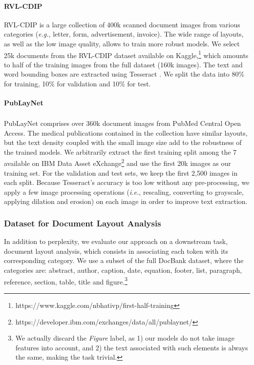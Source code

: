\paragraph{RVL-CDIP}

RVL-CDIP is a large collection of 400k scanned document images from various categories (\textit{e.g.}, letter, form, advertisement, invoice). The wide range of layouts, as well as the low image quality, allows to train more robust models. We select 25k documents from the RVL-CDIP dataset available on Kaggle,\footnote{https://www.kaggle.com/nbhativp/first-half-training} which amounts to half of the training images from the full dataset (160k images). The text and word bounding boxes are extracted using Tesseract \citep{kay2007tesseract}. We split the data into 80\% for training, 10\% for validation and 10\% for test.

\paragraph{PubLayNet}

PubLayNet comprises over 360k document images from PubMed Central\textsuperscript{\texttrademark} Open Access. The medical publications contained in the collection have similar layouts, but the text density coupled with the small image size add to the robustness of the trained models. We arbitrarily extract the first training split among the 7 available on IBM Data Asset eXchange\footnote{https://developer.ibm.com/exchanges/data/all/publaynet/} and use the first 20k images as our training set. For the validation and test sets, we keep the first 2,500 images in each split. Because Tesseract's accuracy is too low without any pre-processing, we apply a few image processing operations (\textit{i.e.}, rescaling, converting to grayscale, applying dilation and erosion) on each image in order to improve text extraction.

\subsubsection{Dataset for Document Layout Analysis}

In addition to perplexity, we evaluate our approach on a downstream task, document layout analysis, which consists in associating each token with its corresponding category. We use a subset of the full DocBank dataset, where the categories are: abstract, author, caption, date, equation, footer, list, paragraph, reference, section, table, title and figure.\footnote{We actually discard the \textit{Figure} label, as 1) our models do not take image features into account, and 2) the text associated with such elements is always the same, making the task trivial.}

